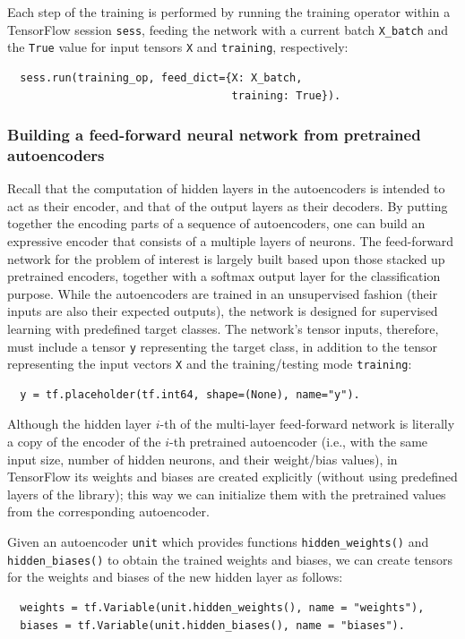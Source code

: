 \documentclass[12pt]{article}
\begin{document}
Each step of the training is performed by running the training operator within a TensorFlow session \texttt{sess}, feeding the network with a current batch \texttt{X\_batch} and the \texttt{True} value for input tensors \texttt{X} and \texttt{training}, respectively:
\begin{verbatim}
  sess.run(training_op, feed_dict={X: X_batch, 
                                   training: True}).
\end{verbatim}

\subsubsection{Building a feed-forward neural network from pretrained autoencoders}

\noindent
Recall that the computation of hidden layers in the autoencoders is intended to act as their encoder, and that of the output layers as their decoders. By putting together the encoding parts of a sequence of autoencoders, one can build an expressive encoder that consists of a multiple layers of neurons. The feed-forward network for the problem of interest is largely built based upon those stacked up pretrained encoders, together with a softmax output layer for the classification purpose. While the autoencoders are trained in an unsupervised fashion (their inputs are also their expected outputs), the network is designed for supervised learning with predefined target classes. The network's tensor inputs, therefore, must include a tensor \texttt{y} representing the target class, in addition to the tensor representing the input vectors \texttt{X} and the training/testing mode \texttt{training}:
\begin{verbatim}
  y = tf.placeholder(tf.int64, shape=(None), name="y").
\end{verbatim}

Although the hidden layer $i$-th of the multi-layer feed-forward network is literally a copy of the encoder of the $i$-th pretrained autoencoder (i.e., with the same input size, number of hidden neurons, and their weight/bias values), in TensorFlow its weights and biases are created explicitly (without using predefined layers of the library); this way we can initialize them with the pretrained values from the corresponding autoencoder.

Given an autoencoder \texttt{unit} which provides functions \texttt{hidden\_weights()} and \texttt{hidden\_biases()} to obtain the trained weights and biases, we can create tensors for the weights and biases of the new hidden layer as follows:
\begin{verbatim}
  weights = tf.Variable(unit.hidden_weights(), name = "weights"),
  biases = tf.Variable(unit.hidden_biases(), name = "biases").
\end{verbatim}
\end{document}
